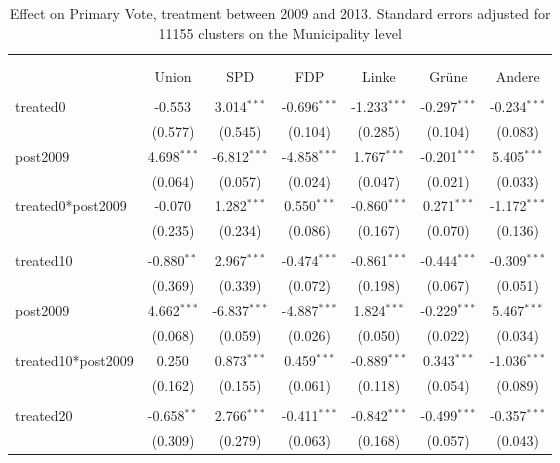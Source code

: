 \documentclass[12pt]{article}
\begin{document}
 
\begin{table}[!htbp] \centering
  \caption{Effect on Primary Vote, treatment between 2009 and 2013. Standard errors adjusted for 11155 clusters on the Municipality level}
\begin{tabular}{@{\extracolsep{5pt}}lcccccc}
\\[-1.8ex]\hline
\hline \\[-1.8ex]
\\[-1.8ex] & \multicolumn{1}{c}{Union} & \multicolumn{1}{c}{SPD} & \multicolumn{1}{c}{FDP} & \multicolumn{1}{c}{Linke} & \multicolumn{1}{c}{Grüne} & \multicolumn{1}{c}{Andere}  \\
\hline \\[-1.8ex]
 treated0 & -0.553$^{}$ & 3.014$^{***}$ & -0.696$^{***}$ & -1.233$^{***}$ & -0.297$^{***}$ & -0.234$^{***}$ \\
  & (0.577) & (0.545) & (0.104) & (0.285) & (0.104) & (0.083) \\
 post2009 & 4.698$^{***}$ & -6.812$^{***}$ & -4.858$^{***}$ & 1.767$^{***}$ & -0.201$^{***}$ & 5.405$^{***}$ \\
  & (0.064) & (0.057) & (0.024) & (0.047) & (0.021) & (0.033) \\
 treated0*post2009 & -0.070$^{}$ & 1.282$^{***}$ & 0.550$^{***}$ & -0.860$^{***}$ & 0.271$^{***}$ & -1.172$^{***}$ \\
  & (0.235) & (0.234) & (0.086) & (0.167) & (0.070) & (0.136) \\
\hline \\[-1.8ex]
 treated10 & -0.880$^{**}$ & 2.967$^{***}$ & -0.474$^{***}$ & -0.861$^{***}$ & -0.444$^{***}$ & -0.309$^{***}$ \\
  & (0.369) & (0.339) & (0.072) & (0.198) & (0.067) & (0.051) \\
 post2009 & 4.662$^{***}$ & -6.837$^{***}$ & -4.887$^{***}$ & 1.824$^{***}$ & -0.229$^{***}$ & 5.467$^{***}$ \\
  & (0.068) & (0.059) & (0.026) & (0.050) & (0.022) & (0.034) \\
 treated10*post2009 & 0.250$^{}$ & 0.873$^{***}$ & 0.459$^{***}$ & -0.889$^{***}$ & 0.343$^{***}$ & -1.036$^{***}$ \\
  & (0.162) & (0.155) & (0.061) & (0.118) & (0.054) & (0.089) \\
\hline \\[-1.8ex]
 treated20 & -0.658$^{**}$ & 2.766$^{***}$ & -0.411$^{***}$ & -0.842$^{***}$ & -0.499$^{***}$ & -0.357$^{***}$ \\
  & (0.309) & (0.279) & (0.063) & (0.168) & (0.057) & (0.043) \\

\end{tabular}
\end{table}
\end{document}
